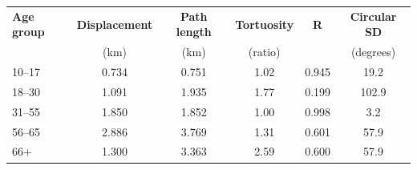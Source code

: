 \begin{tabular}{lccccc}
\toprule
\textbf{Age group} &
\textbf{Displacement} &
\textbf{Path length} &
\textbf{Tortuosity} &
\textbf{R} &
\textbf{Circular SD} \\
 & (km) & (km) & (ratio) & & (degrees) \\
\midrule
10--17 & 0.734 & 0.751 & 1.02 & 0.945 & 19.2 \\
18--30 & 1.091 & 1.935 & 1.77 & 0.199 & 102.9 \\
31--55 & 1.850 & 1.852 & 1.00 & 0.998 & 3.2 \\
56--65 & 2.886 & 3.769 & 1.31 & 0.601 & 57.9 \\
66+ & 1.300 & 3.363 & 2.59 & 0.600 & 57.9 \\
\bottomrule
\end{tabular}
